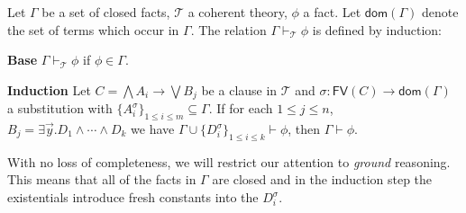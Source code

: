 \documentclass[a4paper,11pt]{article}
\newcommand{\dom}[1]{\mathsf{dom} #1}
\newcommand{\fv}[1]{\mathsf{FV} #1}
\begin{document}
\begin{dfn} \label{clPrv}
Let $\Gamma$ be a set of closed facts, $\mathcal T$ a coherent theory,
$\phi$ a fact.  Let $\dom(\Gamma)$ denote the set of terms which occur in
$\Gamma$. The relation $\Gamma \vdash_{\mathcal T} \phi$ is defined by induction:
\begin{description}
\item{\bf Base} 
$\Gamma \vdash_{\mathcal T} \phi$ if $\phi \in \Gamma$.
\item{\bf Induction}
Let $C = \bigwedge A_i \to \bigvee B_j$ be a clause in $\mathcal T$
and ${\sigma : \fv (C) \to \dom(\Gamma)}$\\
a substitution with
$\{A_i^\sigma\}_{1\leq i\leq m} \subseteq \Gamma$.
If for each $1\leq j\leq n$,\\ 
$B_j = \exists \vec y. D_1 \land \cdots \land D_k$ we have
$\Gamma \cup \{D^\sigma_i\}_{1\leq i\leq k} \vdash \phi$, 
then $\Gamma \vdash \phi$.
\end{description}
With no loss of completeness, we will restrict our attention to \emph{ground} reasoning.
This means that all of the facts in $\Gamma$ are closed and in the induction step
the existentials introduce fresh constants into the $D^\sigma_i$.
\end{dfn}
\end{document}
